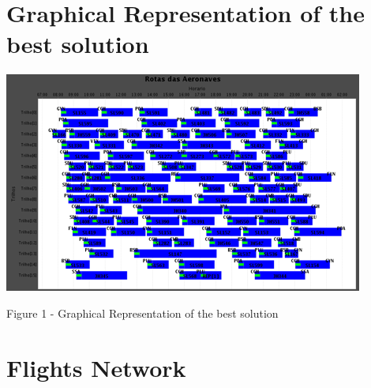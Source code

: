 \documentclass{endm}
\begin{document}
\section{Graphical Representation of the best solution}
\begin{center}
\includegraphics[]{img/formacao.png}
\end{center}
\small{Figure 1 - Graphical Representation of the best solution}

\newpage
\section{Flights Network}
\end{document}
